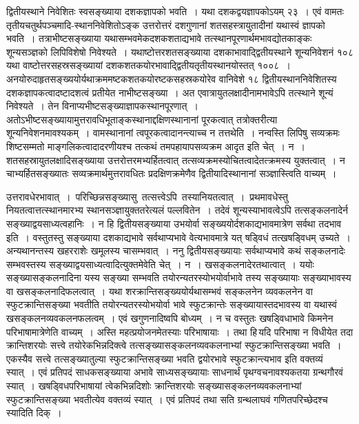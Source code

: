 \documentclass[11pt, openany]{book}
\begin{document}
द्वितीयस्थाने निवेशितः स्वसङ्ख्याया दशकज्ञापको भवति~। यथा दशकद्वयज्ञापकोऽयम् २३~। एवं वामतः तृतीयचतुर्थपञ्चमादि-स्थाननिवेशितोऽङ्क उत्तरोत्तरं
दशगुणानां शतसहस्त्रायुतादीनां यथास्वं ज्ञापको भवति~।
तत्राभीष्टसङ्ख्याया यथासम्भवमेकदशकशताद्यभावे तत्स्थानपूरणार्थमभावद्योतकाङ्कः शून्यसञ्ज्ञको लिपिविशेषो निवेश्यते~। यथाष्टोत्तरशतसङ्ख्याया दशकाभावाद्द्वितीयस्थाने
शून्यनिवेशनं १०८ यथा वाष्टोत्तरसहस्रसङ्ख्यायां दशकशतकयोरभावाद्द्वितीयतृतीयस्थानयोस्तत् १००८~। अनयोरुदाहृतसङ्ख्ययोर्यथाक्रममष्टकशतकयोरष्टकसहस्रकयोरेव वानिवेशे १८ द्वितीयस्थाननिवेशितस्य दशकज्ञापकत्वादष्टादशत्वं प्रतीयेत नाभीष्टसङ्ख्या~। अत एवात्रायुतलक्षादीनामभावेऽपि तत्स्थाने
शून्यं निवेश्यते~। तेन विनाप्यभीष्टसङ्ख्याज्ञापकस्थानपूरणात्~।
अतोऽभीष्टसङ्ख्यायामुत्तरावधिभूताङ्कस्थानाद्दक्षिणस्थानानां पूरकत्वात् तत्रोक्तरीत्या
शून्यनिवेशनमावश्यकम्~। वामस्थानानां त्वपूरकत्वादानन्त्याच्च न तत्तथेति~। नन्वस्ति लिपिषु सव्यक्रमः शिष्टसम्मतो माङ्गलिकत्वादादरणीयश्च तत्कथं तमपहायापसव्यक्रम आदृत इति चेत्~। न~। शतसहस्रायुतलक्षादिसङ्ख्याया उत्तरोत्तरमभ्यर्हितत्वात्
तत्सव्यक्रमस्योचितत्वादेतत्क्रमस्य युक्तत्वात्~। न चाभ्यर्हितसङ्ख्यातः
सव्यक्रमार्थमुत्तरावधितः प्रदक्षिणक्रमेणैव द्वितीयादिस्थानानां सञ्ज्ञास्त्विति वाच्यम्~।
\afterpage{\fancyhead[LE,RO]{\thepage}}
\cfoot{}
 \newpage

\noindent उत्तरावधेरभावात्~। \,परिच्छिन्नसङ्ख्यासु \,तत्सत्त्वेऽपि \,तस्यानियतत्वात्~। \,प्रथमावधेस्तु नियतत्वात्तत्स्थानमारभ्य स्थानसञ्ज्ञायुक्ततरेत्यलं पल्लवितेन~। तदेवं
शून्यस्याभावत्वेऽपि तत्सङ्कलनादेर्न सङ्ख्याद्वयसाध्यत्वहानिः~। न हि
द्वितीयसङ्ख्याया उभयोर्वा सङ्ख्ययोर्दशकाद्यभावमात्रेण सर्वथा तदभाव इति~। वस्तुतस्तु सङ्ख्याया
दशकाद्यभावे सर्वथाप्यभावे वेत्यभावमात्रे यत् षड्विधं तत्खषड्विधम् उच्यते~।
अन्यथानन्तस्य खहरराशेः खमूलस्य चासम्भवात्~। ननु द्वितीयसङ्ख्यायाः सर्वथाप्यभावे कथं
सङ्कलनादेः सम्भवस्तस्य सङ्ख्याद्वयसाध्यत्वादित्युक्तमेवेति चेत्~। न~।
खसङ्कलनादेरतथात्वात्~। ययोः सङ्ख्यासङ्कलनादिना यस्य सङ्ख्या सम्भवति तयोरन्यतरस्योभयोर्वाभावे तस्य सङ्ख्यायाः सङ्ख्याभावस्य वा खसङ्कलनादिफलत्वात्~। यथा
शरक्रान्तिसङ्ख्ययोर्यथासम्भवं सङ्कलनेन व्यवकलनेन वा स्फुटक्रान्तिसङ्ख्या
भवतीति तयोरन्यतरस्योभयोर्वा भावे स्फुटक्रान्तेः सङ्ख्यायास्तदभावस्य वा यथास्वं
खसङ्कलनव्यवकलनफलत्वम्~। एवं खगुणनादिष्वपि बोध्यम्~। न च वस्तुतः
खषड्विधाभावे किमनेन परिभाषामात्रेणेति वाच्यम्~। अस्ति
महत्प्रयोजनमेतस्याः परिभाषायाः~। तथा हि\textendash \,यदि परिभाषा न विधीयेत तदा क्रान्तिशरयोः 
सत्त्वे तयोरेकभिन्नदिक्त्वे तत्सङ्ख्यासङ्कलनव्यवकलनाभ्यां स्फुटक्रान्तिसङ्ख्या
भवति~। एकस्यैव सत्त्वे तत्सङ्ख्यातुल्या स्फुटक्रान्तिसङ्ख्या भवति द्वयोरभावे
स्फुटक्रान्त्यभाव इति वक्तव्यं स्यात्~। एवं प्रतिपदं साधकसङ्ख्याया अभावे साध्यसङ्ख्यायाः
साधनार्थं पृथग्वचनावश्यकतया ग्रन्थगौरवं स्यात्~। खषड्विधपरिभाषायां
त्वेकभिन्नदिशोः क्रान्तिशरयोः सङ्ख्यासङ्कलनव्यवकलनाभ्यां स्फुटक्रान्तिसङ्ख्या भवतीत्येव
वक्तव्यं स्यात्~। एवं प्रतिपदं तथा सति ग्रन्थलाघवं गणितपरिच्छेदश्च स्यादिति दिक्~।
\vspace{2mm}
\end{document}
